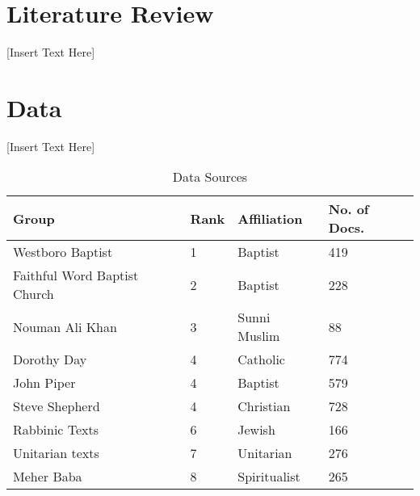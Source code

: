 \documentclass[11pt]{article}
\begin{document}
%
% 

\section{Literature Review}
\label{lit review}

[Insert Text Here]

\section{Data}
\label{data}

[Insert Text Here]

\begin{table}
\begin{tabular}{| l | l | l | l |}
\hline
    Group & Rank & Affiliation & No. of Docs. \\
  \hline
  \hline			
Westboro Baptist & 1 & Baptist & 419 \\
\hline
Faithful Word Baptist Church & 2 & Baptist & 228 \\
\hline
Nouman Ali Khan & 3 & Sunni Muslim & 88 \\
\hline
Dorothy Day & 4 & Catholic & 774 \\
\hline
John Piper & 4 & Baptist & 579 \\
\hline
Steve Shepherd & 4 & Christian & 728 \\
\hline
Rabbinic Texts & 6 & Jewish & 166 \\
\hline
Unitarian texts & 7 & Unitarian & 276 \\
\hline
Meher Baba & 8 & Spiritualist & 265 \\
\hline
\end{tabular}
\caption{Data Sources}
\end{table}
\end{document}
